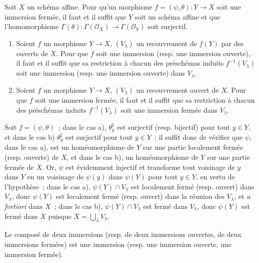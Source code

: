 \begin{corollary}[4.2.3]
\label{I.4.2.3-fr}
Soit $X$ un schéma affine. Pour qu'un morphisme
$f=(\psi,\theta):Y\to X$ soit une immersion fermée, il faut et il suffit que
$Y$ soit un schéma affine et que l'homomorphisme
$\Gamma(\theta):\Gamma(\mathscr{O}_X)\to\Gamma(\mathscr{O}_Y)$ soit surjectif.
\end{corollary}

\begin{corollary}[4.2.4]
\label{I.4.2.4-fr}
\begin{enumerate}
  \item[a)] Soient $f$ un morphisme $Y\to X$, $(V_\lambda)$ un recouvrement
  de $f(Y)$ par des ouverts de $X$. Pour que $f$ soit une immersion (resp. une
  immersion ouverte), il faut et il suffit
  que sa restriction à chacun des préschémas induits $f^{-1}(V_\lambda)$ soit
  une immersion (resp. une immersion ouverte) dans $V_\lambda$.
  \item[b)] Soient $f$ un morphisme $Y\to X$, $(V_\lambda)$ un recouvrement
  ouvert de $X$. Pour que $f$ soit une immersion fermée, il faut et il suffit
  que sa restriction à chacun des préschémas induits $f^{-1}(V_\lambda)$ soit
  une immersion fermée dans $V_\lambda$.
\end{enumerate}
\end{corollary}

Soit $f=(\psi,\theta)$~; dans le cas a), $\theta_y^\sharp$ est surjectif
(resp. bijectif) pour tout $y\in Y$, et dans le cas b) $\theta_y^\sharp$ est
surjectif pour tout $y\in Y$~; il suffit donc de vérifier que $\psi$, dans le
cas a), est un homéomorphisme de $Y$ sur une partie localement fermée (resp.
ouverte) de $X$, et dans le cas b), un homéomorphisme de $Y$ sur une partie
fermée de $X$. Or, $\psi$ est évidemment injectif et transforme tout voisinage
de $y$ dans $Y$ en un voisinage de $\psi(y)$ dans $\psi(Y)$ pour tout $y\in Y$,
en vertu de l'hypothèse~; dans le cas a), $\psi(Y)\cap V_\lambda$ est localement
fermé (resp. ouvert) dans $V_\lambda$, donc $\psi(Y)$ est localement fermé
(resp. ouvert) dans la réunion des $V_\lambda$, et \emph{a fortiori} dans $X$~;
dans le cas b), $\psi(Y)\cap V_\lambda$ est fermé dans $V_\lambda$, donc
$\psi(Y)$ est fermé dans $X$ puisque $X=\bigcup_\lambda V_\lambda$.

\begin{proposition}[4.2.5]
\label{I.4.2.5-fr}
Le composé de deux immersions (resp. de deux immersions ouvertes, de deux
immersions fermées) est une immersion (resp. une immersion ouverte, une
immersion fermée).
\end{proposition}

